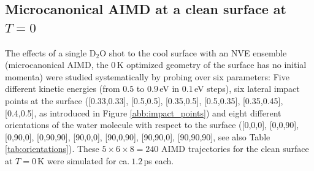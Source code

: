 \documentclass[11pt,DIV=13,BCOR=5mm,a4paper,headinclude]{scrbook}
\begin{document}
\subsection{Microcanonical AIMD at a clean surface at $T=0$}\label{sec:mic_clean}
The effects of a single D$_2$O shot to the cool surface with an NVE ensemble (microcanonical AIMD, the $0\,$K optimized geometry of the surface has no initial momenta) were studied systematically by probing over six parameters: Five different kinetic energies (from $0.5$ to $0.9\,$eV in $0.1\,$eV steps), six lateral impact points at the surface ([0.33,0.33], [0.5,0.5], [0.35,0.5], [0.5,0.35], [0.35,0.45], [0.4,0.5], as introduced in Figure \ref{abb:impact_points}) and eight different orientations of the water molecule with respect to the surface ([0,0,0], [0,0,90], [0,90,0], [0,90,90], [90,0,0], [90,0,90], [90,90,0], [90,90,90], see also Table \ref{tab:orientations}).
These $5\times 6\times 8=240$ AIMD trajectories for the clean surface at $T=0\,$K were simulated for ca.$~1.2\,$ps each.
\end{document}
